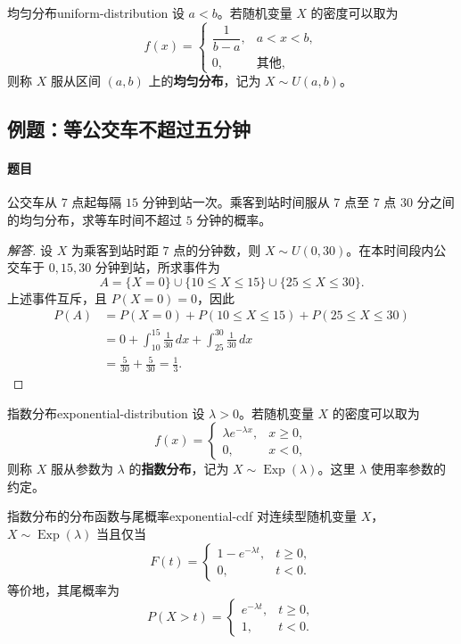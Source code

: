 \begin{mydefinition}{均匀分布}{uniform-distribution}
设 $a<b$。若随机变量 $X$ 的密度可以取为
\[
f(x)=
\begin{cases}
\dfrac1{b-a},&a<x<b,\\[0.4em]
0,&\text{其他},
\end{cases}
\]
则称 $X$ 服从区间 $(a,b)$ 上的\textbf{均匀分布}，记为 $X\sim U(a,b)$。
\end{mydefinition}

\subsection{例题：等公交车不超过五分钟}\label{note:c2:e13}
\paragraph{题目}
公交车从 $7$ 点起每隔 $15$ 分钟到站一次。乘客到站时间服从 $7$ 点至 $7$ 点 $30$ 分之间的均匀分布，求等车时间不超过 $5$ 分钟的概率。

\begin{proof}[解答]
设 $X$ 为乘客到站时距 $7$ 点的分钟数，则 $X\sim U(0,30)$。在本时间段内公交车于 $0,15,30$ 分钟到站，所求事件为
\[
A=\{X=0\}\cup\{10\leq X\leq15\}\cup\{25\leq X\leq30\}.
\]
上述事件互斥，且 $P(X=0)=0$，因此
\[
\begin{aligned}
P(A)
&=P(X=0)+P(10\leq X\leq15)+P(25\leq X\leq30)\\
&=0+\int_{10}^{15}\frac1{30}\,dx+\int_{25}^{30}\frac1{30}\,dx\\
&=\frac5{30}+\frac5{30}=\frac13.
\end{aligned}
\]
\end{proof}

\begin{mydefinition}{指数分布}{exponential-distribution}
设 $\lambda>0$。若随机变量 $X$ 的密度可以取为
\[
f(x)=
\begin{cases}
\lambda e^{-\lambda x},&x\geq0,\\
0,&x<0,
\end{cases}
\]
则称 $X$ 服从参数为 $\lambda$ 的\textbf{指数分布}，记为 $X\sim\operatorname{Exp}(\lambda)$。这里 $\lambda$ 使用率参数的约定。
\end{mydefinition}

\begin{proposition}{指数分布的分布函数与尾概率}{exponential-cdf}
对连续型随机变量 $X$，$X\sim\operatorname{Exp}(\lambda)$ 当且仅当
\[
F(t)=
\begin{cases}
1-e^{-\lambda t},&t\geq0,\\
0,&t<0.
\end{cases}
\]
等价地，其尾概率为
\[
P(X>t)=
\begin{cases}
e^{-\lambda t},&t\geq0,\\
1,&t<0.
\end{cases}
\]
\end{proposition}

